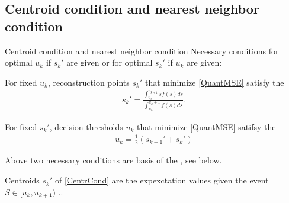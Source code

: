 \subsection{Centroid condition and nearest neighbor condition}
\begin{frame}{Centroid condition and nearest neighbor condition}
Necessary conditions for optimal $u_k$ if $s_k'$ are given 
or for optimal $s_k'$ if $u_k$ are given: 
\begin{proposition} 
\bit
\item For fixed $u_k$, reconstruction points $s_k'$ that minimize \eqref{QuantMSE} %
satisfy the 
\begin{align}\label{CentrCond}
s_k'=\frac{\int_{u_k}^{u_{k+1}}sf(s)ds}{\int_{u_k}^{u_k+1}f(s)ds}.
\end{align}
\item For fixed $s_k'$, decision thresholds $u_k$ that minimize \eqref{QuantMSE} %
satifsy the 
\begin{align}\label{NearestNB}
u_k=\frac{1}{2}\left(s_{k-1}'+s_k'\right)
\end{align}
\eit
\end{proposition}
\bit
\item Above two necessary conditions are basis of the , see below. 
\item Centroids $s_k'$ of \eqref{CentrCond} are the expexctation values given the event $S\in[u_k,u_{k+1})$ ..  
\eit
%
%
\end{frame}

